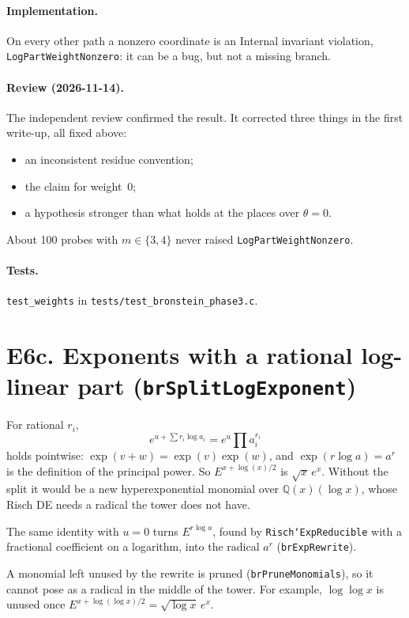 \documentclass[11pt]{article}
\theoremstyle{definition}
\theoremstyle{remark}
\newcommand{\Q}{\mathbb{Q}}
\newcommand{\code}[1]{\texttt{#1}}
\begin{document}
\paragraph{Implementation.} On every other path a nonzero coordinate is an
Internal invariant violation, \code{LogPartWeightNonzero}: it can be a bug, but
not a missing branch.

\paragraph{Review (2026-11-14).} The independent review confirmed the result.
It corrected three things in the first write-up, all fixed above:
\begin{itemize}
\item an inconsistent residue convention;
\item the claim for weight~0;
\item a hypothesis stronger than what holds at the places over $\theta=0$.
\end{itemize}
About 100 probes with $m\in\{3,4\}$ never raised \code{LogPartWeightNonzero}.

\paragraph{Tests.} \code{test\_weights} in \code{tests/test\_bronstein\_phase3.c}.

\section*{E6c. Exponents with a rational log-linear part (\code{brSplitLogExponent})}

For rational $r_i$,
\[ e^{u+\sum r_i\log a_i}=e^u\prod a_i^{r_i} \]
holds pointwise: $\exp(v+w)=\exp(v)\exp(w)$, and $\exp(r\log a)=a^r$ is the
definition of the principal power. So $E^{x+\log(x)/2}$ is $\sqrt x\,e^x$.
Without the split it would be a new hyperexponential monomial over
$\Q(x)(\log x)$, whose Risch DE needs a radical the tower does not have.

The same identity with $u=0$ turns $E^{r\log a}$, found by
\code{Risch`ExpReducible} with a fractional coefficient on a logarithm, into
the radical $a^r$ (\code{brExpRewrite}).

A monomial left unused by the rewrite is pruned (\code{brPruneMonomials}), so
it cannot pose as a radical in the middle of the tower. For example,
$\log\log x$ is unused once $E^{x+\log(\log x)/2}=\sqrt{\log x}\,e^x$.
\end{document}
